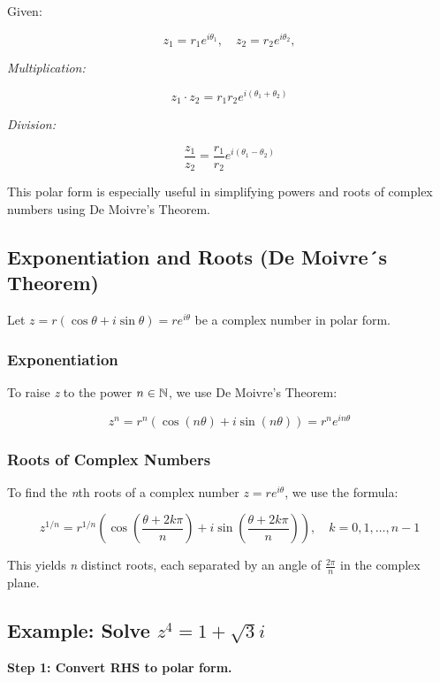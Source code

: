 Given:

\[
	z_1 = r_1 e^{i\theta_1}, \quad z_2 = r_2 e^{i\theta_2},
\]

\emph{Multiplication:}

\[
	z_1 \cdot z_2 = r_1 r_2 e^{i(\theta_1 + \theta_2)}
\]

\emph{Division:}
	      
\[
	\frac{z_1}{z_2} = \frac{r_1}{r_2} e^{i(\theta_1 - \theta_2)}
\]

This polar form is especially useful in simplifying powers and roots of complex numbers using De 
Moivre’s Theorem.

\subsection{Exponentiation and Roots (De Moivre´s Theorem)}

Let \( z = r(\cos \theta + i \sin \theta) = re^{i\theta} \) be a complex number in polar form.

\subsubsection{Exponentiation}

To raise \emph{z} to the power \( n \in \mathbb{N} \), we use De Moivre’s Theorem:

\[
	z^n = r^n (\cos(n\theta) + i \sin(n\theta)) = r^n e^{in\theta}
\]

\subsubsection{Roots of Complex Numbers}

To find the \emph{n}th roots of a complex number \( z = r e^{i\theta} \), we use the formula:

\[
	z^{1/n} = r^{1/n} \left( \cos\left( \frac{\theta + 2k\pi}{n} \right) + i \sin\left( \frac{\theta + 
	2k\pi}{n} \right) \right), \quad k = 0, 1, \ldots, n-1
\]

This yields \emph{n} distinct roots, each separated by an angle of \( \frac{2\pi}{n} \) in 
the complex plane.

\subsection{Example: Solve \texorpdfstring{\( z^4 = 1 + \sqrt{3}i \)}{}}

\textbf{Step 1: Convert RHS to polar form.}

